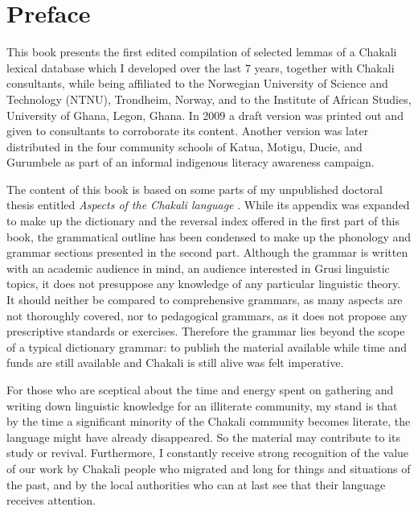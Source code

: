 \chapter*{Preface} 



This book presents the first edited compilation of selected lemmas of a Chakali 
lexical database which  I developed over the last 7 years, together with Chakali 
consultants, while being affiliated to the Norwegian University of Science and 
Technology (NTNU), Trondheim, Norway, 
 and   to the Institute of African Studies, University of Ghana, Legon, 
Ghana.   In 2009 a draft version  was printed out  and given to consultants 
to corroborate its content. Another version was later distributed in the four 
community 
schools of Katua, Motigu, Ducie,  and Gurumbele  as part of  an informal 
indigenous literacy awareness campaign. 

The content of this book is based on some
parts of my unpublished doctoral  thesis entitled   {\it Aspects of the Chakali 
language} \citep{brin11}. While its appendix was expanded to make up the 
dictionary and the  reversal index offered in the first part of this book, the 
grammatical outline has been condensed to make up the phonology and grammar 
sections presented in the second part.  Although the grammar is written with an 
academic audience in mind, an audience interested in  Grusi linguistic topics, 
it does not presuppose any knowledge of any particular linguistic theory.  It 
should neither be compared to comprehensive grammars,  as many aspects are not 
thoroughly covered,  nor to  pedagogical grammars, as it does not propose any 
prescriptive standards or exercises. Therefore the grammar lies beyond the scope 
of a typical dictionary grammar: to  publish the material available while time 
and funds are still available and Chakali is still alive was felt  
imperative.

For those who are sceptical about the time and energy spent on gathering and 
writing down linguistic  knowledge for an illiterate community, my stand is 
that  by the time a significant minority of the Chakali 
community becomes literate, the language might have already disappeared.  So 
the material may contribute to its study or revival.  Furthermore,   I
constantly receive strong recognition of the value of our work by Chakali 
people who 
migrated and long for things and situations of the past, and by the local 
authorities who can at last see that their language  receives attention.


